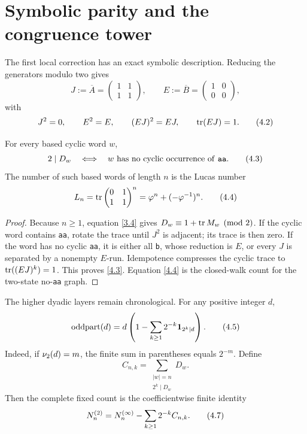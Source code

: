 \section{Symbolic parity and the congruence tower}
\label{sec:parity}

The first local correction has an exact symbolic description.  Reducing the
generators modulo two gives
\[
 J:=\overline A=\begin{pmatrix}1&1\\1&1\end{pmatrix},
 \qquad
 E:=\overline B=\begin{pmatrix}1&0\\0&0\end{pmatrix},
 \tag{4.1}\label{4.1}
\]
with
\[
 J^2=0,\qquad E^2=E,\qquad (EJ)^2=EJ,
 \qquad \operatorname{tr}(EJ)=1.
 \tag{4.2}\label{4.2}
\]

\begin{theorem}
\label{thm:parity}
For every based cyclic word \(w\),
\[
 2\mid D_w
 \quad\Longleftrightarrow\quad
 w\text{ has no cyclic occurrence of \texttt{aa}}.
 \tag{4.3}\label{4.3}
\]
The number of such based words of length \(n\) is the Lucas number
\[
 L_n=\operatorname{tr}\begin{pmatrix}0&1\\1&1\end{pmatrix}^{n}
 =\varphi^n+(-\varphi^{-1})^n.
 \tag{4.4}\label{4.4}
\]
\end{theorem}

\begin{proof}
Because \(n\ge1\), equation \eqref{3.4} gives
\(D_w\equiv1+\operatorname{tr} M_w\pmod2\).  If the cyclic word contains
\texttt{aa}, rotate the trace until \(J^2\) is adjacent; its trace is then
zero.  If the word has no cyclic \texttt{aa}, it is either all \texttt{b},
whose reduction is \(E\), or every \(J\) is separated by a nonempty
\(E\)-run.  Idempotence compresses the cyclic trace to
\(\operatorname{tr}((EJ)^k)=1\).  This proves \eqref{4.3}.  Equation \eqref{4.4} is the
closed-walk count for the two-state no-\texttt{aa} graph.
\end{proof}

The higher dyadic layers remain chronological.  For any positive integer
\(d\),
\[
 \operatorname{oddpart}(d)
 =d\left(1-\sum_{k\ge1}2^{-k}\mathbf 1_{2^k\mid d}\right).
 \tag{4.5}\label{4.5}
\]
Indeed, if \(\nu_2(d)=m\), the finite sum in parentheses equals \(2^{-m}\).
Define
\[
 C_{n,k}=\sum_{\substack{|w|=n\\2^k\mid D_w}}D_w.
 \tag{4.6}\label{4.6}
\]
Then the complete fixed count is the coefficientwise finite identity
\[
 N^{(2)}_n=N^{(\infty)}_n-\sum_{k\ge1}2^{-k}C_{n,k}.
 \tag{4.7}\label{4.7}
\]

